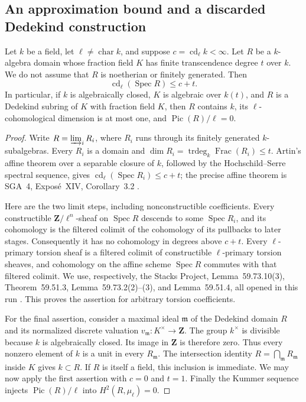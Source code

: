 \subsection{An approximation bound and a discarded Dedekind construction}

\begin{lemma}
\label{C:A2-approximation}
Let $k$ be a field, let $\ell\ne\operatorname{char}k$, and suppose
$c=\operatorname{cd}_{\ell}k<\infty$.  Let $R$ be a $k$-algebra domain
whose fraction field $K$ has finite transcendence degree $t$ over $k$.
We do not assume that $R$ is noetherian or finitely generated.  Then
\[
\operatorname{cd}_{\ell}(\operatorname{Spec}R)\le c+t.
\]
In particular, if $k$ is algebraically closed, $K$ is algebraic over
$k(t)$, and $R$ is a Dedekind subring of $K$ with fraction field $K$,
then $R$ contains $k$, its $\ell$-cohomological dimension is at most
one, and $\operatorname{Pic}(R)/\ell=0$.
\end{lemma}

\begin{proof}
Write $R=\varinjlim_i R_i$, where $R_i$ runs through its finitely
generated $k$-subalgebras.  Every $R_i$ is a domain and
$\dim R_i=\operatorname{trdeg}_k\operatorname{Frac}(R_i)\le t$.
Artin's affine theorem over a separable closure of $k$, followed by
the Hochschild--Serre spectral sequence, gives
$\operatorname{cd}_{\ell}(\operatorname{Spec}R_i)\le c+t$; the
precise affine theorem is SGA~4, Expos\'e~XIV, Corollary~3.2
\cite{C_SGA4}.

Here are the two limit steps, including nonconstructible coefficients.
Every constructible $\mathbf Z/\ell^n$-sheaf on
$\operatorname{Spec}R$ descends to some $\operatorname{Spec}R_i$,
and its cohomology is the filtered colimit of the cohomology of its
pullbacks to later stages.  Consequently it has no cohomology in
degrees above $c+t$.  Every $\ell$-primary torsion sheaf is a filtered
colimit of constructible $\ell$-primary torsion sheaves, and cohomology
on the affine scheme $\operatorname{Spec}R$ commutes with that
filtered colimit.  We use, respectively, the Stacks Project,
Lemma~59.73.10(3), Theorem~59.51.3, Lemma~59.73.2(2)--(3), and
Lemma~59.51.4, all opened in this run \cite{C_StacksLimits}.
This proves the assertion for arbitrary torsion coefficients.

For the final assertion, consider a maximal ideal $\mathfrak m$ of
the Dedekind domain $R$ and its normalized discrete valuation
$v_{\mathfrak m}\colon K^\times\to\mathbf Z$.  The group $k^\times$
is divisible because $k$ is algebraically closed.  Its image in
$\mathbf Z$ is therefore zero.  Thus every nonzero element of $k$
is a unit in every $R_{\mathfrak m}$.  The intersection identity
$R=\bigcap_{\mathfrak m}R_{\mathfrak m}$ inside $K$ gives $k\subset R$.
If $R$ is itself a field, this inclusion is immediate.  We may now
apply the first assertion with $c=0$ and $t=1$.  Finally the Kummer
sequence injects $\operatorname{Pic}(R)/\ell$ into
$H^2(R,\mu_\ell)=0$.
\end{proof}

